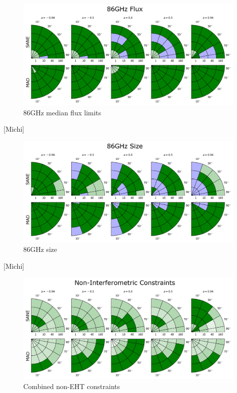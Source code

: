 \begin{figure}
  \centering
  \includegraphics[width=\columnwidth]{./figures/86GHz_flux.png}
  \caption{86GHz median flux limits}
  \label{fig:cmp_86ghz_flux}
\end{figure}

[Michi]


\begin{figure}
  \centering
  \includegraphics[width=\columnwidth]{./figures/86GHz_size.png}
  \caption{86GHz size}
  \label{fig:cmp_86ghz_size}
\end{figure}

[Michi]


\begin{figure}
  \centering
  \includegraphics[width=\columnwidth]{./figures/Noninterferometric_Hard_Cut.png}
  \caption{Combined non-EHT constraints}
  \label{fig:non_eht_cuts}
\end{figure}

